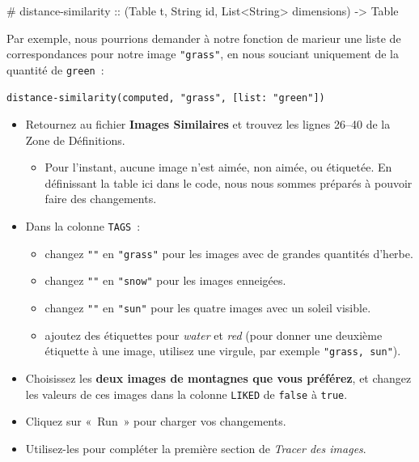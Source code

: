 \documentclass[12pt,a4paper]{article}
\newcommand{\contrat}[1]{%
  \begin{contractbox}
    \ttfamily #1
  \end{contractbox}
}
\begin{document}
\contrat{\# distance-similarity :: (Table t, String id, List<String> dimensions) -> Table}

\begin{codebox}
Par exemple, nous pourrions demander à notre fonction de marieur une liste de correspondances pour notre image \texttt{"grass"}, en nous souciant uniquement de la quantité de \texttt{green}~:
\begin{lstlisting}
distance-similarity(computed, "grass", [list: "green"])
  \end{lstlisting}
\end{codebox}

\begin{activitybox}
  \begin{itemize}
    \item Retournez au fichier \textbf{Images Similaires} et trouvez les lignes 26--40 de la Zone de Définitions.
    \begin{itemize}
      \item Pour l'instant, aucune image n'est aimée, non aimée, ou étiquetée. En définissant la table ici dans le code, nous nous sommes préparés à pouvoir faire des changements.
    \end{itemize}
    \item Dans la colonne \texttt{TAGS}~:
    \begin{itemize}
      \item changez \texttt{""} en \texttt{"grass"} pour les images avec de grandes quantités d'herbe.
      \item changez \texttt{""} en \texttt{"snow"} pour les images enneigées.
      \item changez \texttt{""} en \texttt{"sun"} pour les quatre images avec un soleil visible.
      \item ajoutez des étiquettes pour \emph{water} et \emph{red} (pour donner une deuxième étiquette à une image, utilisez une virgule, par exemple \texttt{"grass, sun"}).
    \end{itemize}
    \item Choisissez les \textbf{deux images de montagnes que vous préférez}, et changez les valeurs de ces images dans la colonne \texttt{LIKED} de \texttt{false} à \texttt{true}.
    \item Cliquez sur «~Run~» pour charger vos changements.
    \item Utilisez-les pour compléter la première section de \emph{Tracer des images}.
  \end{itemize}
\end{activitybox}
\end{document}

